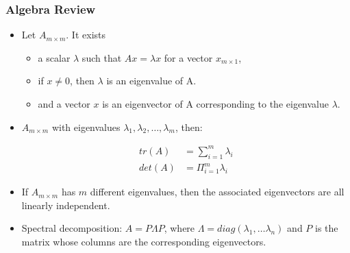 \documentclass[
  shownotes,
  xcolor={svgnames},
  hyperref={colorlinks,citecolor=DarkBlue,linkcolor=DarkRed,urlcolor=DarkBlue}
  , aspectratio=169]{beamer}
\begin{document}
\begin{frame}
\frametitle{Algebra Review}

\begin{itemize}

\item Let $A_{m\times m}$. It exists 
\begin{itemize}
  \item a scalar $\lambda$ such that $Ax = \lambda x$ for a vector $x_{m\times 1}$, 
  \item if $x \neq 0$, then $\lambda$ is an eigenvalue of A. 
  \item and a vector $x$ is an eigenvector of A corresponding to the eigenvalue $\lambda$.
\end{itemize}

\item $A_{m\times m}$ with eigenvalues $\lambda_1, \lambda_2,\dots,\lambda_m$, then:

\begin{align}
tr(A) &= \sum_{i=1}^m \lambda_i \\
det(A) &= \Pi_{i=1}^m \lambda_i
\end{align}

\item If $A_{m\times m}$ has $m$ different eigenvalues, then the associated eigenvectors are all linearly independent.
\item Spectral decomposition: $A = P\Lambda P$, where $\Lambda = diag(\lambda_1, \dots \lambda_n )$ and $P$ is the matrix whose columns are the corresponding eigenvectors.
\end{itemize}

\end{frame}
\end{document}
